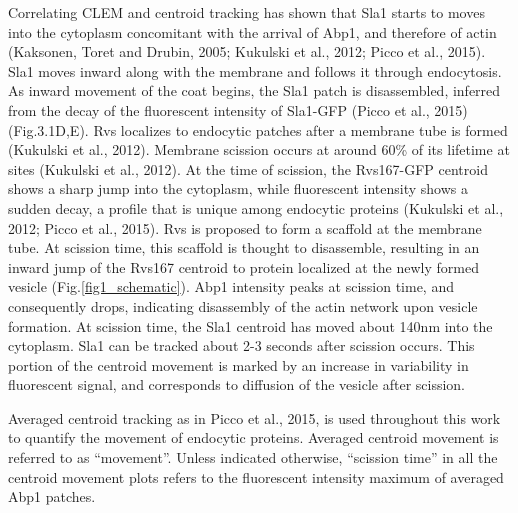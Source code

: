 \vspace{7mm}
Correlating CLEM and centroid tracking has shown that Sla1 starts to moves into the cytoplasm concomitant with the arrival of Abp1, and therefore of actin (Kaksonen, Toret and Drubin, 2005; Kukulski et al., 2012; Picco et al., 2015). Sla1 moves inward along with the membrane and follows it through endocytosis. As inward movement of the coat begins, the Sla1 patch is disassembled, inferred from the decay of the fluorescent intensity of Sla1-GFP (Picco et al., 2015) (Fig.3.1D,E). Rvs localizes to endocytic patches after a membrane tube is formed (Kukulski et al., 2012). Membrane scission occurs at around 60\% of its lifetime at sites (Kukulski et al., 2012). At the time of scission, the Rvs167-GFP centroid shows a sharp jump into the cytoplasm, while fluorescent intensity shows a sudden decay, a profile that is unique among endocytic proteins (Kukulski et al., 2012; Picco et al., 2015). Rvs is proposed to form a scaffold at the membrane tube. At scission time, this scaffold is thought to disassemble, resulting in an inward jump of the Rvs167 centroid to protein localized at the newly formed vesicle (Fig.\ref{fig1_schematic}). Abp1 intensity peaks at scission time, and consequently drops, indicating disassembly of the actin network upon vesicle formation. At scission time, the Sla1 centroid has moved about 140nm into the cytoplasm. Sla1 can be tracked about 2-3 seconds after scission occurs. This portion of the centroid movement is marked by an increase in variability in fluorescent signal, and corresponds to diffusion of the vesicle after scission.


\vspace{7mm}
Averaged centroid tracking as in Picco et al., 2015, is used throughout this work to quantify the movement of endocytic proteins. Averaged centroid movement is referred to as “movement”. Unless indicated otherwise, “scission time” in all the centroid movement plots refers to the fluorescent intensity maximum of averaged Abp1 patches.



